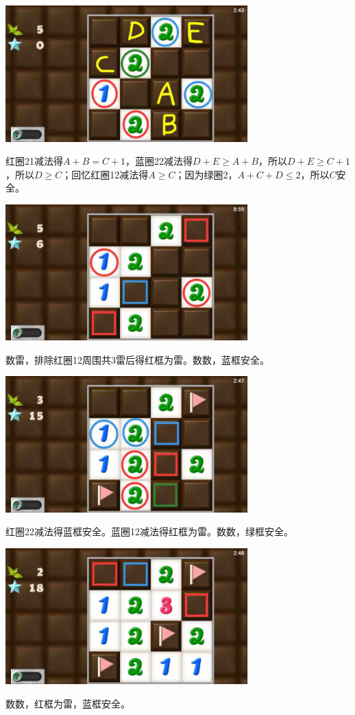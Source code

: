 \subsection{} %
\begin{center}
    \includegraphics[width=0.7\textwidth]{puzzlelow/151-1.jpg}
\end{center}
红圈21减法得$A+B=C+1$，蓝圈22减法得$D+E\ge A+B$，所以$D+E\ge C+1$，所以$D\ge C$；回忆红圈12减法得$A\ge C$；因为绿圈2，$A+C+D\le 2$，所以$C$安全。
\begin{center}
    \includegraphics[width=0.7\textwidth]{puzzlelow/151-2.jpg}
\end{center}
数雷，排除红圈12周围共3雷后得红框为雷。数数，蓝框安全。
\begin{center}
    \includegraphics[width=0.7\textwidth]{puzzlelow/151-3.jpg}
\end{center}
红圈22减法得蓝框安全。蓝圈12减法得红框为雷。数数，绿框安全。
\begin{center}
    \includegraphics[width=0.7\textwidth]{puzzlelow/151-4.jpg}
\end{center}
数数，红框为雷，蓝框安全。

